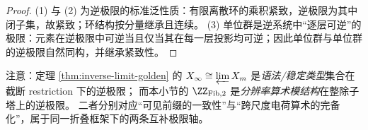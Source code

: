 \begin{proof}
(1) 与 (2) 为逆极限的标准泛性质：有限离散环的乘积紧致，逆极限为其中闭子集，故紧致；环结构按分量继承且连续。
(3) 单位群是逆系统中“逐层可逆”的极限：元素在逆极限中可逆当且仅当其在每一层投影均可逆；因此单位群与单位群的逆极限自然同构，并继承紧致性。
\end{proof}

\begin{remark}\label{rem:fib-adic-vs-syntax}
注意：定理 \ref{thm:inverse-limit-golden} 的 $X_\infty\cong\varprojlim X_m$ 是\emph{语法/稳定类型}集合在截断 restriction 下的逆极限；
而本小节的 $\ZZ_{\mathrm{Fib},2}$ 是\emph{分辨率算术模结构}在整除子塔上的逆极限。
二者分别对应“可见前缀的一致性”与“跨尺度电荷算术的完备化”，属于同一折叠框架下的两条互补极限轴。
\end{remark}
